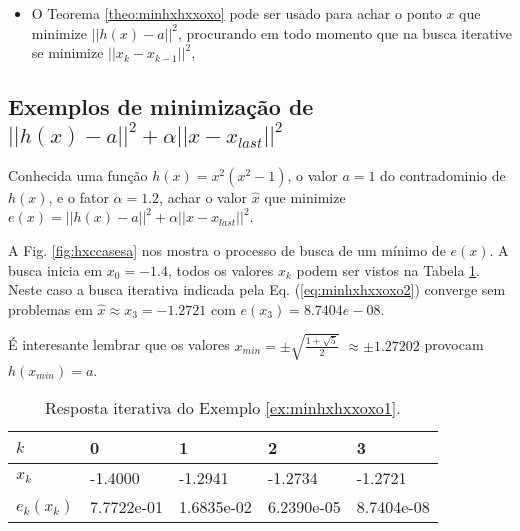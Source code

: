 \begin{tcbattention}
\begin{itemize}
\item O Teorema \ref{theo:minhxhxxoxo} pode ser usado para achar o ponto $x$
que minimize $||h(x)-a||^2$, procurando 
em todo momento que na busca iterative se minimize $||x_{k}-x_{k-1}||^2$,
\end{itemize}
\end{tcbattention}
\subsection{Exemplos de minimização de $||h(x)-a||^2+\alpha ||x-x_{last}||^2$}


\begin{example}\label{ex:minhxhxxoxo1}
Conhecida uma função $h(x)=x^2(x^2-1)$, o valor $a=1$ do contradominio de $h(x)$,
e o fator $\alpha=1.2$,
achar o valor $\hat{x}$ que minimize $e(x)=||h(x)-a||^2+\alpha||x-x_{last}||^2$.
\end{example}
\begin{SolutionT}\label{sol:minhxhxxoxo1}
 A Fig. \ref{fig:hxccasesa} nos mostra o processo de busca de um mínimo
 de $e(x)$. A busca inicia em $x_0=-1.4$,
 todos os valores $x_{k}$ podem ser vistos na Tabela \ref{tab:hxccases1}. 
Neste caso a busca iterativa indicada pela Eq. (\ref{eq:minhxhxxoxo2}) converge sem problemas 
em $\hat{x}\approx x_3 =-1.2721$ com $e(x_3)=8.7404e-08$.

É interesante lembrar que os valores $x_{min}=\pm \sqrt{\frac{1+\sqrt{5}}{2}}$ 
$\approx \pm 1.27202$ provocam $h(x_{min})=a$.
\end{SolutionT}

\begin{table}[!h]
\centering
\begin{tabular}{|l|l|l|l|l|}
\hline
$k$      & 0 & 1 & 2 & 3 \\ \hline
$x_k$    & -1.4000 & -1.2941 & -1.2734 & -1.2721 \\ \hline
$e_k(x_k)$ & 7.7722e-01 & 1.6835e-02 & 6.2390e-05 & 8.7404e-08 \\ \hline
\end{tabular}
\caption{Resposta iterativa do Exemplo \ref{ex:minhxhxxoxo1}.}
\label{tab:hxccases1}
\end{table}

